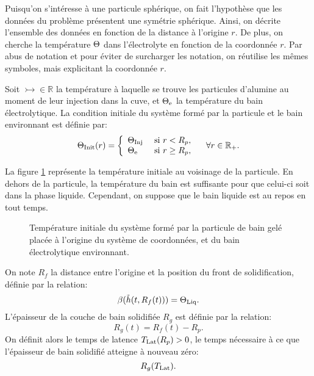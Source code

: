 Puisqu'on s'intéresse à une particule sphérique, on fait l'hypothèse
que les données du problème présentent une symétrie sphérique. Ainsi,
on décrite l'ensemble des données en fonction de la distance à
l'origine $r$. De plus, on cherche la température $\Theta$ dans
l'électrolyte en fonction de la coordonnée $r$. Par abus de notation
et pour éviter de surcharger les notation, on réutilise les mêmes
symboles, mais explicitant la coordonnée $r$.

Soit $\tinj\in\mathbb R$ la température à laquelle se trouve les
particules d'alumine au moment de leur injection dans la cuve, et
$\Theta_\mathrm{e}$ la température du bain électrolytique. La condition
initiale du système formé par la particule et le bain environnant est
définie par:
\begin{equation}
  \Theta_\text{Init}(r) = \left\{
  \begin{array}{ll}
    \Theta_\text{Inj} & \text{ si } r < R_p,\\
    \Theta_\mathrm{e} & \text{ si } r \geq R_p,\\
  \end{array}
  \right.\quad \forall r\in \mathbb R_+ .\label{eq:initial-temperature}
\end{equation}

La figure \ref{fig:particle-initial-temperature} représente la
température initiale au voisinage de la particule. En dehors de la
particule, la température du bain est suffisante pour que celui-ci
soit dans la phase liquide. Cependant, on suppose que le bain liquide
est au repos en tout temps.

\begin{figure}[h]
  \begin{center}
    
    \caption{Température initiale du système formé par la particule de
      bain gelé placée à l'origine du système de coordonnées, et du
      bain électrolytique environnant.}
    \label{fig:particle-initial-temperature}
  \end{center}
\end{figure}

On note $R_f$ la distance entre l'origine et la position du front de
solidification, définie par la relation:
\begin{equation}
\beta(\tilde{h}(t, R_f(t))) = \Theta_\text{Liq}.
\end{equation}
L'épaisseur de la couche de bain solidifiée $R_g$ est définie par la
relation:
\begin{equation}
R_g(t) = R_f(t) - R_p.
\end{equation}
On définit alors le temps de latence $T_\text{Lat}(R_p) > 0$, le temps
nécessaire à ce que l'épaisseur de bain solidifié atteigne à nouveau
zéro:
\begin{equation}
  R_g(T_\text{Lat}).
\end{equation}

